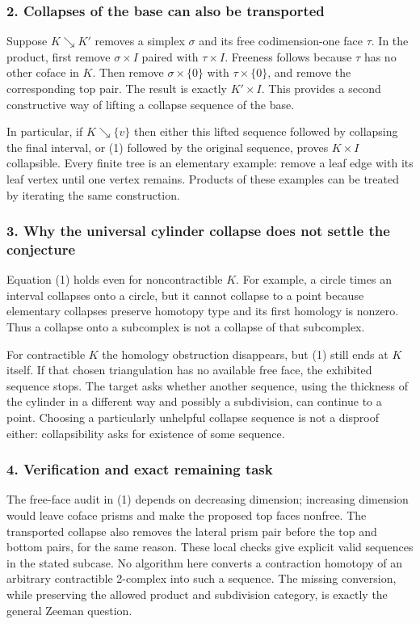 \documentclass[11pt,a4paper]{article}
\begin{document}
\subsubsection{2. Collapses of the base can also be transported}
Suppose $K\searrow K'$ removes a simplex $\sigma$ and its free codimension-one face $\tau$. In the product, first remove $\sigma\times I$ paired with $\tau\times I$. Freeness follows because $\tau$ has no other coface in $K$. Then remove $\sigma\times\{0\}$ with $\tau\times\{0\}$, and remove the corresponding top pair. The result is exactly $K'\times I$. This provides a second constructive way of lifting a collapse sequence of the base.

In particular, if $K\searrow\{v\}$ then either this lifted sequence followed by collapsing the final interval, or (1) followed by the original sequence, proves $K\times I$ collapsible. Every finite tree is an elementary example: remove a leaf edge with its leaf vertex until one vertex remains. Products of these examples can be treated by iterating the same construction.

\subsubsection{3. Why the universal cylinder collapse does not settle the conjecture}
Equation (1) holds even for noncontractible $K$. For example, a circle times an interval collapses onto a circle, but it cannot collapse to a point because elementary collapses preserve homotopy type and its first homology is nonzero. Thus a collapse onto a subcomplex is not a collapse of that subcomplex.

For contractible $K$ the homology obstruction disappears, but (1) still ends at $K$ itself. If that chosen triangulation has no available free face, the exhibited sequence stops. The target asks whether another sequence, using the thickness of the cylinder in a different way and possibly a subdivision, can continue to a point. Choosing a particularly unhelpful collapse sequence is not a disproof either: collapsibility asks for existence of some sequence.

\subsubsection{4. Verification and exact remaining task}
The free-face audit in (1) depends on decreasing dimension; increasing dimension would leave coface prisms and make the proposed top faces nonfree. The transported collapse also removes the lateral prism pair before the top and bottom pairs, for the same reason. These local checks give explicit valid sequences in the stated subcase. No algorithm here converts a contraction homotopy of an arbitrary contractible 2-complex into such a sequence. The missing conversion, while preserving the allowed product and subdivision category, is exactly the general Zeeman question.
\end{document}
